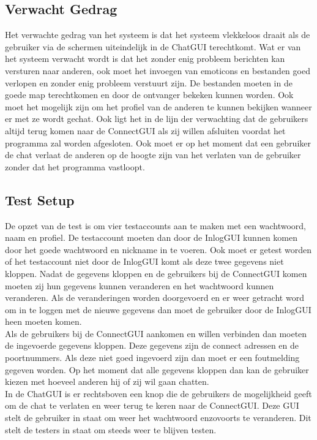 \documentclass[12pt]{article}
\begin{document}
\subsection{Verwacht Gedrag}
Het verwachte gedrag van het systeem is dat het systeem vlekkeloos draait als de gebruiker via de schermen uiteindelijk in de ChatGUI terechtkomt. Wat er van het systeem verwacht wordt is dat het zonder enig probleem berichten kan versturen naar anderen, ook moet het invoegen van emoticons en bestanden goed verlopen en zonder enig probleem verstuurt zijn. De bestanden moeten in de goede map terechtkomen en door de ontvanger bekeken kunnen worden. Ook moet het mogelijk zijn om het profiel van de anderen te kunnen bekijken wanneer er met ze wordt gechat. Ook ligt het in de lijn der verwachting dat de gebruikers altijd terug komen naar de ConnectGUI als zij willen afsluiten voordat het programma zal worden  afgesloten. Ook moet er op het moment dat een gebruiker de chat verlaat de anderen op de hoogte zijn van het verlaten van de gebruiker zonder dat het programma vastloopt.

\subsection{Test Setup}
De opzet van de test is om vier testaccounts aan te maken met een wachtwoord, naam en profiel. De testaccount moeten dan door de InlogGUI kunnen komen door het goede wachtwoord en nickname in te voeren. Ook moet er getest worden of het testaccount niet door de InlogGUI komt als deze twee gegevens niet kloppen. Nadat de gegevens kloppen en de gebruikers bij de ConnectGUI komen moeten zij hun gegevens kunnen veranderen en het wachtwoord kunnen veranderen. Als de veranderingen worden doorgevoerd en er weer getracht word om in te loggen met de nieuwe gegevens dan moet de gebruiker door de InlogGUI heen moeten komen. \\

\noindent Als de gebruikers bij de ConnectGUI aankomen en willen verbinden dan moeten de ingevoerde gegevens kloppen. Deze gegevens zijn de connect adressen en de poortnummers. Als deze niet goed ingevoerd zijn dan moet er een foutmelding gegeven worden. Op het moment dat alle gegevens kloppen dan kan de gebruiker kiezen met hoeveel anderen hij of zij wil gaan chatten. \\

\noindent In de ChatGUI is er rechtsboven een knop die de gebruikers de mogelijkheid geeft om de chat te verlaten en weer terug te keren naar de ConnectGUI. Deze GUI stelt de  gebruiker in staat om weer het wachtwoord enzovoorts te veranderen. Dit stelt de testers in staat om steeds weer te blijven testen.
\end{document}
